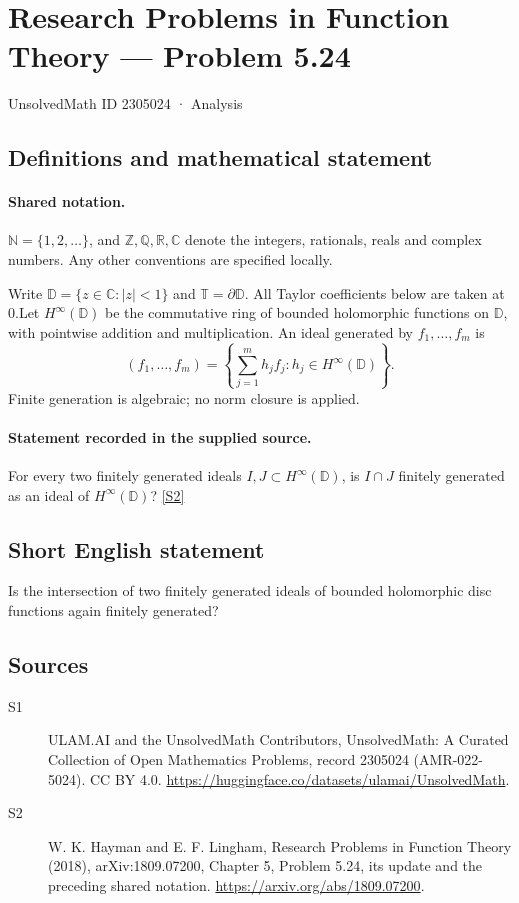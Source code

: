 \documentclass[11pt]{article}
\newcommand{\sref}[2]{\hyperlink{source:#1:#2}{[S#2]}}
\begin{document}
\setcounter{section}{2305023}
\section{Research Problems in Function Theory — Problem 5.24}\label{2305024}
{\small\sffamily UnsolvedMath ID 2305024 · Analysis}
\subsection{Definitions and mathematical statement}

\paragraph{Shared notation.}$\mathbb N=\{1,2,\ldots\}$, and $\mathbb Z,\mathbb Q,\mathbb R,\mathbb C$ denote the integers, rationals, reals and complex numbers. Any other conventions are specified locally.


Write $\mathbb D=\{z\in\mathbb C:|z|<1\}$ and $\mathbb T=\partial\mathbb D$. All Taylor coefficients below are taken at $0$.Let $H^\infty(\mathbb D)$ be the commutative ring of bounded holomorphic functions on $\mathbb D$, with pointwise addition and multiplication. An ideal generated by $f_1,\ldots,f_m$ is
\[(f_1,\ldots,f_m)=\left\{\sum_{j=1}^m h_j f_j:h_j\in H^\infty(\mathbb D)\right\}.
\]
Finite generation is algebraic; no norm closure is applied.
\paragraph{Statement recorded in the supplied source.}
For every two finitely generated ideals $I,J\subset H^\infty(\mathbb D)$, is $I\cap J$ finitely generated as an ideal of $H^\infty(\mathbb D)$? \sref{2305024}{2}
\subsection{Short English statement}
Is the intersection of two finitely generated ideals of bounded holomorphic disc functions again finitely generated?
\subsection{Sources}
\begin{description}
\item[\hypertarget{source:2305024:1}{S1}] ULAM.AI and the UnsolvedMath Contributors, UnsolvedMath: A Curated Collection of Open Mathematics Problems, record 2305024 (AMR-022-5024). CC BY 4.0. \url{https://huggingface.co/datasets/ulamai/UnsolvedMath}.
\item[\hypertarget{source:2305024:2}{S2}] W. K. Hayman and E. F. Lingham, Research Problems in Function Theory (2018), arXiv:1809.07200, Chapter 5, Problem 5.24, its update and the preceding shared notation. \url{https://arxiv.org/abs/1809.07200}.
\end{description}
\label{end:2305024}
\end{document}
